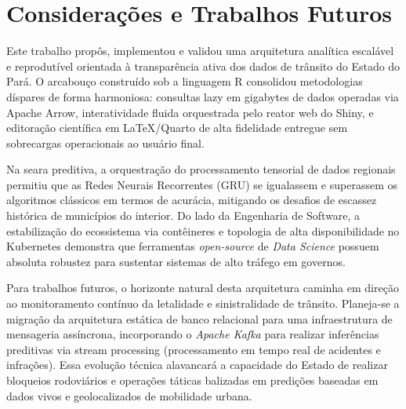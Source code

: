 \documentclass[12pt]{article}
\begin{document}
\section{Considerações e Trabalhos Futuros}

Este trabalho propôs, implementou e validou uma arquitetura analítica escalável e reprodutível orientada à transparência ativa dos dados de trânsito do Estado do Pará. O arcabouço construído sob a linguagem R consolidou metodologias díspares de forma harmoniosa: consultas lazy em gigabytes de dados operadas via Apache Arrow, interatividade fluida orquestrada pelo reator web do Shiny, e editoração científica em LaTeX/Quarto de alta fidelidade entregue sem sobrecargas operacionais ao usuário final. 

Na seara preditiva, a orquestração do processamento tensorial de dados regionais permitiu que as Redes Neurais Recorrentes (GRU) se igualassem e superassem os algoritmos clássicos em termos de acurácia, mitigando os desafios de escassez histórica de municípios do interior. Do lado da Engenharia de Software, a estabilização do ecossistema via contêineres e topologia de alta disponibilidade no Kubernetes demonstra que ferramentas \textit{open-source} de \textit{Data Science} possuem absoluta robustez para sustentar sistemas de alto tráfego em governos.

\label{sec:conclui}
Para trabalhos futuros, o horizonte natural desta arquitetura caminha em direção ao monitoramento contínuo da letalidade e sinistralidade de trânsito. Planeja-se a migração da arquitetura estática de banco relacional para uma infraestrutura de mensageria assíncrona, incorporando o \textit{Apache Kafka} para realizar inferências preditivas via stream processing (processamento em tempo real de acidentes e infrações). Essa evolução técnica alavancará a capacidade do Estado de realizar bloqueios rodoviários e operações táticas balizadas em predições baseadas em dados vivos e geolocalizados de mobilidade urbana.



\end{document}
